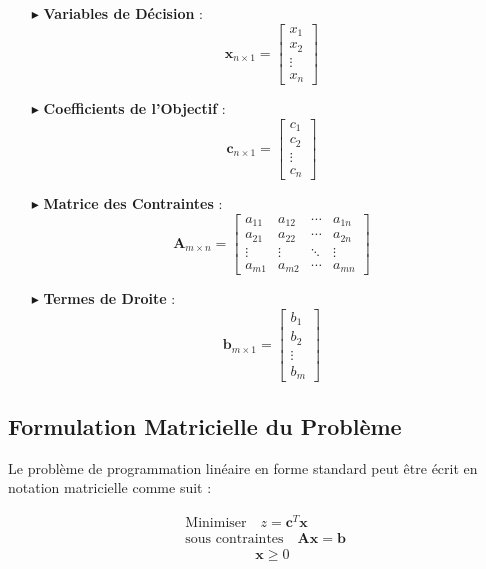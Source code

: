 \documentclass{report}
\begin{document}
\begin{multicols*}{2}
\begin{itemize}
    \item[$\blacktriangleright$] \textbf{Variables de Décision} :
    \[
    \mathbf{x}_{n \times 1} = 
    \begin{bmatrix}
    x_1 \\
    x_2 \\
    \vdots \\
    x_n
    \end{bmatrix}
    \]
    \item[$\blacktriangleright$] \textbf{Coefficients de l'Objectif} :
    \[
    \mathbf{c}_{n \times 1} = 
    \begin{bmatrix}
    c_1 \\
    c_2 \\
    \vdots \\
    c_n
    \end{bmatrix}
    \]
    \item[$\blacktriangleright$] \textbf{Matrice des Contraintes} :
    \[
    \mathbf{A}_{m \times n} = 
    \begin{bmatrix}
    a_{11} & a_{12} & \cdots & a_{1n} \\
    a_{21} & a_{22} & \cdots & a_{2n} \\
    \vdots & \vdots & \ddots & \vdots \\
    a_{m1} & a_{m2} & \cdots & a_{mn}
    \end{bmatrix}
    \]
    \item[$\blacktriangleright$] \textbf{Termes de Droite} :
    \[
    \mathbf{b}_{m \times 1} = 
    \begin{bmatrix}
    b_1 \\
    b_2 \\
    \vdots \\
    b_m
    \end{bmatrix}
    \]
\end{itemize}

\subsection*{Formulation Matricielle du Problème}

Le problème de programmation linéaire en forme standard peut être écrit en notation matricielle comme suit :

\begin{align*}
& \text{Minimiser} \quad z = \mathbf{c}^T \mathbf{x} \\
& \text{sous contraintes} \quad \mathbf{A} \mathbf{x} = \mathbf{b} \\
& \quad \quad \quad \quad \quad \mathbf{x} \geq 0
\end{align*}


\end{multicols*}
\end{document}
